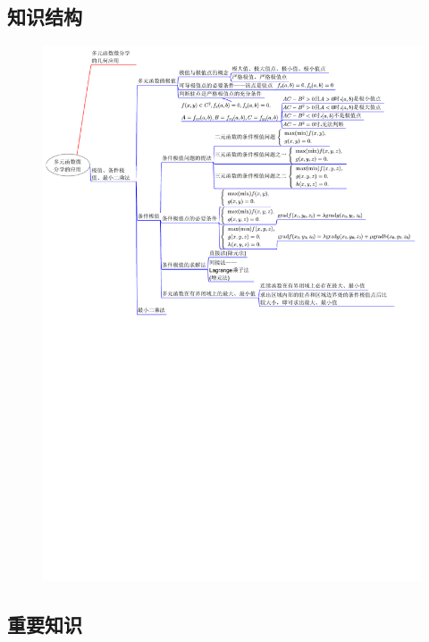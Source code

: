 \documentclass[12pt,UTF8]{ctexart}
\begin{document}
\subsection{知识结构}
\begin{figure}[H]
\begin{center}
\includegraphics[height=0.9\textheight,angle=0]{20190610-1.pdf}
\end{center}
\end{figure}
\subsection{重要知识}
\end{document}
